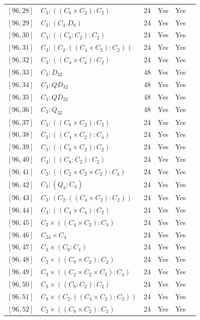 \documentclass[12pt, a4paper]{article}
\theoremstyle{plain}
\theoremstyle{definition}
\begin{document}
\begin{longtable}{llcccl}
  $[96,28]$ & $C_3 : ((C_8 \times C_2) : C_2)$ & 24 & Yes & Yes \\
  $[96,29]$ & $C_3 : (C_4 . D_8)$ & 24 & Yes & Yes \\
  $[96,30]$ & $C_3 : ((C_8 : C_2) : C_2)$ & 24 & Yes & Yes \\
  $[96,31]$ & $C_3 : (C_2 . ((C_4 \times C_2) : C_2))$ & 24 & Yes & Yes \\
  $[96,32]$ & $C_3 : ((C_4 \times C_4) : C_2)$ & 24 & Yes & Yes \\
  $[96,33]$ & $C_3 : D_{32}$ & 48 & Yes & Yes \\
  $[96,34]$ & $C_3 : QD_{32}$ & 48 & Yes & Yes \\
  $[96,35]$ & $C_3 : QD_{32}$ & 48 & Yes & Yes \\
  $[96,36]$ & $C_3 : Q_{32}$ & 48 & Yes & Yes \\
  $[96,37]$ & $C_3 : ((C_8 \times C_2) : C_2)$ & 24 & Yes & Yes \\
  $[96,38]$ & $C_3 : ((C_4 \times C_2) : C_4)$ & 24 & Yes & Yes \\
  $[96,39]$ & $C_3 : ((C_8 \times C_2) : C_2)$ & 24 & Yes & Yes \\
  $[96,40]$ & $C_3 : ((C_8 : C_2) : C_2)$ & 24 & Yes & Yes \\
  $[96,41]$ & $C_3 : ((C_2 \times C_2 \times C_2) : C_4)$ & 24 & Yes & Yes \\
  $[96,42]$ & $C_3 : (Q_8 : C_4)$ & 24 & Yes & Yes \\
  $[96,43]$ & $C_3 : (C_2 . ((C_4 \times C_2) : C_2))$ & 24 & Yes & Yes \\
  $[96,44]$ & $C_3 : ((C_4 \times C_4) : C_2)$ & 24 & Yes & Yes \\
  $[96,45]$ & $C_3 \times ((C_4 \times C_2) : C_4)$ & 24 & Yes & Yes \\
  $[96,46]$ & $C_{24} \times C_4$ & 24 & Yes & Yes \\
  $[96,47]$ & $C_3 \times (C_8 : C_4)$ & 24 & Yes & Yes \\
  $[96,48]$ & $C_3 \times ((C_8 \times C_2) : C_2)$ & 24 & Yes & Yes \\
  $[96,49]$ & $C_3 \times ((C_2 \times C_2 \times C_2) : C_4)$ & 24 & Yes & Yes \\
  $[96,50]$ & $C_3 \times ((C_8 : C_2) : C_2)$ & 24 & Yes & Yes \\
  $[96,51]$ & $C_3 \times (C_2 . ((C_4 \times C_2) : C_2))$ & 24 & Yes & Yes \\
  $[96,52]$ & $C_3 \times ((C_8 \times C_2) : C_2)$ & 24 & Yes & Yes \\

\end{longtable}
\end{document}
